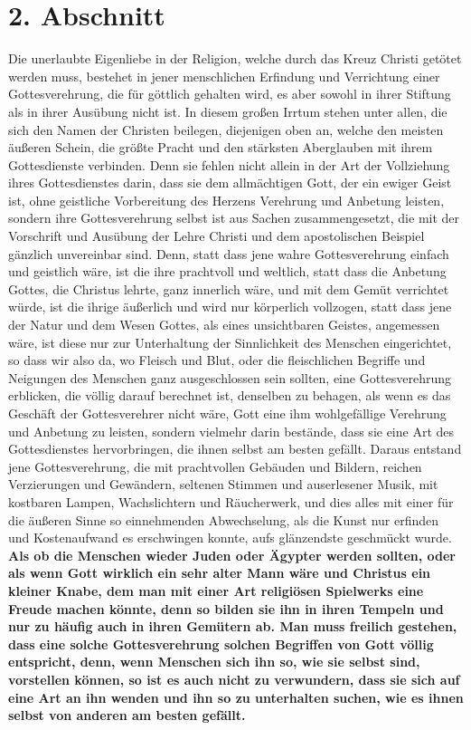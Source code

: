 \section{2. Abschnitt} \label{kap5_ab2}

Die unerlaubte Eigenliebe in der Religion, welche durch das Kreuz Christi
getötet werden muss, bestehet in jener menschlichen Erfindung und Verrichtung
einer Gottesverehrung, die für göttlich gehalten wird, es aber sowohl in ihrer
Stiftung als in ihrer Ausübung nicht ist. In diesem großen Irrtum stehen unter
allen, die sich den Namen der Christen beilegen, diejenigen oben an, welche den
meisten äußeren Schein, die größte Pracht und den stärksten Aberglauben mit
ihrem Gottesdienste verbinden. Denn sie fehlen nicht allein in der Art der
Vollziehung ihres Gottesdienstes darin, dass sie dem allmächtigen Gott, der ein
ewiger Geist ist, ohne geistliche Vorbereitung 
des Herzens Verehrung und
Anbetung leisten, sondern ihre Gottesverehrung selbst ist aus Sachen
zusammengesetzt, die mit der Vorschrift und Ausübung der Lehre Christi und dem
apostolischen Beispiel gänzlich unvereinbar sind. Denn, statt dass jene wahre
Gottesverehrung einfach und geistlich wäre, ist die ihre prachtvoll und
weltlich, statt dass die Anbetung Gottes, die Christus lehrte, ganz innerlich
wäre, und mit dem Gemüt verrichtet würde, ist die ihrige äußerlich und wird
nur körperlich vollzogen, statt dass jene der Natur und dem Wesen Gottes, als
eines unsichtbaren Geistes, angemessen wäre, ist diese nur zur Unterhaltung der
Sinnlichkeit des Menschen eingerichtet, so dass wir also da, wo Fleisch und
Blut,
oder die fleischlichen Begriffe und Neigungen des Menschen ganz ausgeschlossen
sein sollten, eine Gottesverehrung erblicken, die völlig darauf berechnet ist,
denselben zu behagen, als wenn es das Geschäft der Gottesverehrer nicht wäre,
Gott eine ihm wohlgefällige Verehrung und Anbetung zu leisten, sondern vielmehr
darin bestände, dass sie eine Art des Gottesdienstes hervorbringen, die ihnen
selbst am besten gefällt. Daraus entstand jene Gottesverehrung, die mit
prachtvollen Gebäuden und Bildern, reichen Verzierungen und Gewändern, seltenen
Stimmen und auserlesener Musik, mit kostbaren Lampen,
Wachslichtern und
Räucherwerk, und dies alles mit einer für die äußeren Sinne
so
einnehmenden
Abwechselung, als die Kunst nur erfinden und Kostenaufwand es erschwingen
konnte, aufs glänzendste geschmückt wurde. \label{ref:05_02_kasperletheater}
\textbf{Als ob die Menschen wieder Juden
oder Ägypter  werden sollten,
oder als wenn Gott  wirklich ein sehr alter Mann
wäre und Christus ein kleiner Knabe, dem man mit einer Art religiösen
Spielwerks eine Freude machen könnte, denn so bilden sie ihn in ihren Tempeln
und nur zu häufig auch in ihren Gemütern ab. Man muss freilich gestehen, dass
eine solche Gottesverehrung solchen Begriffen von Gott völlig entspricht, denn,
wenn Menschen sich ihn so, wie sie selbst sind, vorstellen können, so ist es
auch nicht zu verwundern, dass sie sich auf eine Art an ihn wenden und ihn so
zu
unterhalten suchen, wie es ihnen selbst von anderen am besten gefällt.}

